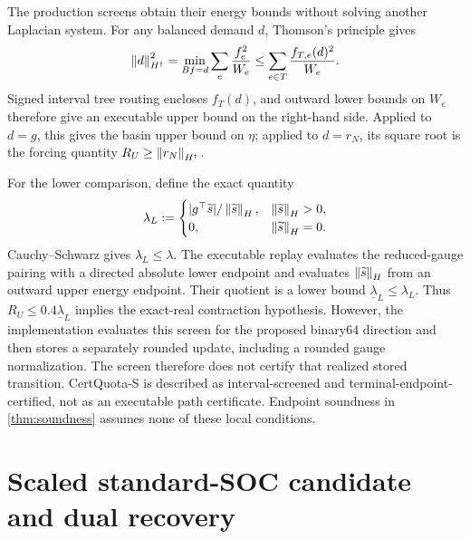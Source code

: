 The production screens obtain their energy bounds without solving another
Laplacian system.  For any balanced demand $d$, Thomson's principle gives
\begin{equation}
 \left\lVert d\right\rVert_{H^\dagger}^2
 =\min_{Bf=d}\sum_e\frac{f_e^2}{W_e}
 \le \sum_{e\in T}\frac{f_{T,e}(d)^2}{W_e}.
 \label{eq:tree-energy-upper}
\end{equation}
Signed interval tree routing encloses $f_T(d)$, and outward lower bounds on
$W_e$ therefore give an executable upper bound on the right-hand side.  Applied
to $d=g$, this gives the basin upper bound on $\eta$; applied to $d=r_N$, its
square root is the forcing quantity $R_U\ge\left\lVert r_N\right\rVert_{H^\dagger}$.

For the lower comparison, define the exact quantity
\[
 \lambda_L:=
 \begin{cases}
 |g^\top\widetilde s|/\left\lVert\widetilde s\right\rVert_H,
   & \left\lVert\widetilde s\right\rVert_H>0,\\
 0, & \left\lVert\widetilde s\right\rVert_H=0.
 \end{cases}
\]
Cauchy--Schwarz gives $\lambda_L\le\lambda$.  The executable replay evaluates
the reduced-gauge pairing with a directed absolute lower endpoint and evaluates
$\left\lVert\widetilde s\right\rVert_H$ from an outward upper energy endpoint.  Their quotient
is a lower bound $\underline\lambda_L\le\lambda_L$.  Thus
$R_U\le0.4\underline\lambda_L$ implies the exact-real contraction hypothesis.
However, the implementation evaluates this screen for the proposed binary64
direction and then stores a separately rounded update, including a rounded
gauge normalization.  The screen therefore does not certify that realized
stored transition.  CertQuota-S is described as interval-screened and
terminal-endpoint-certified, not as an executable path certificate.  Endpoint
soundness in \cref{thm:soundness} assumes none of these local conditions.

\section{Scaled standard-SOC candidate and dual recovery}
\label{app:conic}

